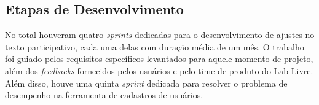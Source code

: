 \subsection {Etapas de Desenvolvimento}

No total houveram quatro \textit{sprints} dedicadas para o desenvolvimento de ajustes no texto participativo, cada uma delas com duração média de um mês.
O trabalho foi guiado pelos requisitos específicos levantados para aquele momento de projeto, além dos \textit{feedbacks} fornecidos pelos usuários e pelo time de produto do Lab Livre.
Além disso, houve uma quinta \textit{sprint} dedicada para resolver o problema de desempenho na ferramenta de cadastros de usuários.







